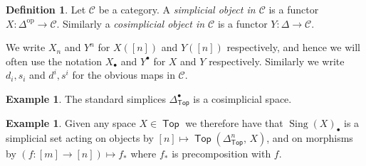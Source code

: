 \documentclass{amsart}
\DeclareMathOperator{\Sing}{Sing}
\DeclareMathOperator{\Top}{\mathsf{Top}}
\DeclareMathOperator{\op}{op}
\theoremstyle{definition}
\newtheorem{definition}[theorem]{Definition}
\newtheorem{example}[theorem]{Example}
\begin{document}
\begin{definition} Let $\mathcal{C}$ be a category. A \textit{simplicial object
  in $\mathcal{C}$} is a functor
  $X: \Delta^{\op} \to \mathcal{C}$.
  Similarly a \textit{cosimplicial object in $\mathcal{C}$} is a functor
  $Y:\Delta \to \mathcal{C}$.
\end{definition}
We write $X_n$ and $Y^n$ for $X([n])$ and $Y([n])$ respectively, and hence we
will often use the notation $X_\bullet$ and $Y^\bullet$ for $X$ and
$Y$ respectively.
Similarly we write $d_i,s_i$ and $d^i,s^i$ for the obvious maps in $\mathcal{C}$.


\begin{example}
  The standard simplices $\Delta^\bullet_{\Top}$ is a cosimplicial space.
\end{example}
\begin{example}
  Given any space $X\in \Top$ we therefore have that
  $\Sing(X)_\bullet$ is a simplicial set acting on objects by
  $[n]\mapsto \Top(\Delta^n_{\Top}, \, X)$, and on morphisms by
  $(f:[m]\to [n])\mapsto f_*$ where $f_*$ is precomposition
  with $f$.
\end{example}
\end{document}

